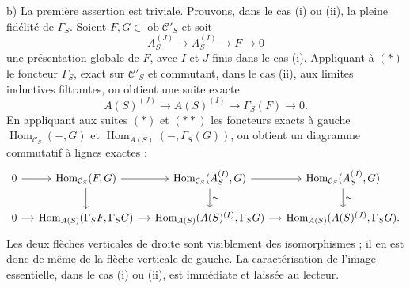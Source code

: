 \documentclass[11pt]{article}
\providecommand{\Ob}{\operatorname{ob}}
\begin{document}
b) La première assertion est triviale. Prouvons, dans le cas (i) ou (ii), la pleine fidélité de $\Gamma_S$. Soient $F,G\in\Ob\mathcal C'_S$ et soit
\[
A_S^{(J)}\longrightarrow A_S^{(I)}\longrightarrow F\longrightarrow0
\tag{$*$}
\]
une présentation globale de $F$, avec $I$ et $J$ finis dans le cas (i). Appliquant à $(*)$ le foncteur $\Gamma_S$, exact sur $\mathcal C'_S$ et commutant, dans le cas (ii), aux limites inductives filtrantes, on obtient une suite exacte
\[
A(S)^{(J)}\longrightarrow A(S)^{(I)}\longrightarrow\Gamma_S(F)\longrightarrow0.
\tag{$**$}
\]
En appliquant aux suites $(*)$ et $(**)$ les foncteurs exacts à gauche $\operatorname{Hom}_{\mathcal C_S}(-,G)$ et $\operatorname{Hom}_{A(S)}(-,\Gamma_S(G))$, on obtient un diagramme commutatif à lignes exactes :
\[
\begin{tikzcd}[column sep=small]
0 \arrow[r] & \operatorname{Hom}_{\mathcal C_S}(F,G) \arrow[r] \arrow[d] &
\operatorname{Hom}_{\mathcal C_S}(A_S^{(I)},G) \arrow[r] \arrow[d,"\sim"] &
\operatorname{Hom}_{\mathcal C_S}(A_S^{(J)},G) \arrow[d,"\sim"] \\
0 \arrow[r] & \operatorname{Hom}_{A(S)}(\Gamma_SF,\Gamma_SG) \arrow[r] &
\operatorname{Hom}_{A(S)}(A(S)^{(I)},\Gamma_SG) \arrow[r] &
\operatorname{Hom}_{A(S)}(A(S)^{(J)},\Gamma_SG).
\end{tikzcd}
\]
Les deux flèches verticales de droite sont visiblement des isomorphismes ; il en est donc de même de la flèche verticale de gauche. La caractérisation de l'image essentielle, dans le cas (i) ou (ii), est immédiate et laissée au lecteur.
\end{document}
